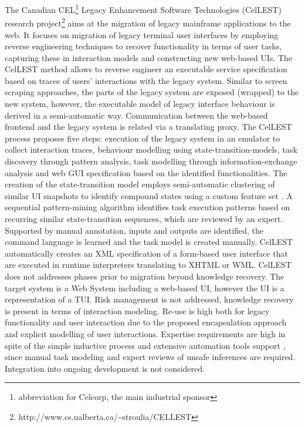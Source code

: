 The Canadian CEL\footnote{abbreviation for Celcorp, the main industrial sponsor} Legacy Enhancement Software Technologies (CelLEST) \autocite{Stroulia2003,Stroulia2002,Stroulia2002Book,El-Ramly2002,Stroulia1999,Kong1999} research project\footnote{http://www.cs.ualberta.ca/\textasciitilde stroulia/CELLEST} aims at the migration of legacy mainframe applications to the web.
It focuses on migration of legacy terminal user interfaces by employing reverse engineering techniques to recover functionality in terms of user tasks, capturing these in interaction models and constructing new web-based UIs.
The CelLEST method allows to reverse engineer an executable service specification based on traces of users' interactions with the legacy system.
Similar to screen scraping approaches, the parts of the legacy system are exposed (wrapped) to the new system, however, the executable model of legacy interface behaviour is derived in a semi-automatic way.
Communication between the web-based frontend and the legacy system is related via a translating proxy.
The CelLEST process proposes five steps: execution of the legacy system in an emulator to collect interaction traces, behaviour modelling using state-transition-models, task discovery through pattern analysis, task modelling through information-exchange analysis and web GUI specification based on the identified functionalities.
The creation of the state-transition model employs semi-automatic clustering of similar UI snapshots to identify compound states using a custom feature set \autocite{Stroulia1999}.
A sequential pattern-mining algorithm \autocite{El-Ramly2002} identifies task execution patterns based on recurring similar state-transition sequences, which are reviewed by an expert.
Supported by manual annotation, inputs and outputs are identified, the command language is learned and the task model is created manually.
CelLEST automatically creates an XML specification of a form-based user interface that are executed in runtime interpreters translating to XHTML or WML.
CelLEST does not addresses phases prior to migration beyond knowledge recovery.
The target system is a Web System including a web-based UI, however the UI is a representation of a TUI.
Risk management is not addressed, knowledge recovery is present in terms of interaction modeling.
Re-use is high both for legacy functionality and user interaction due to the proposed encapsulation approach and explicit modelling of user interactions.
Expertise requirements are high in spite of the simple inductive process and extensive automation tools support \autocite{Stroulia2002}, since manual task modeling and expert reviews of unsafe inferences are required.
Integration into ongoing development is not considered.

